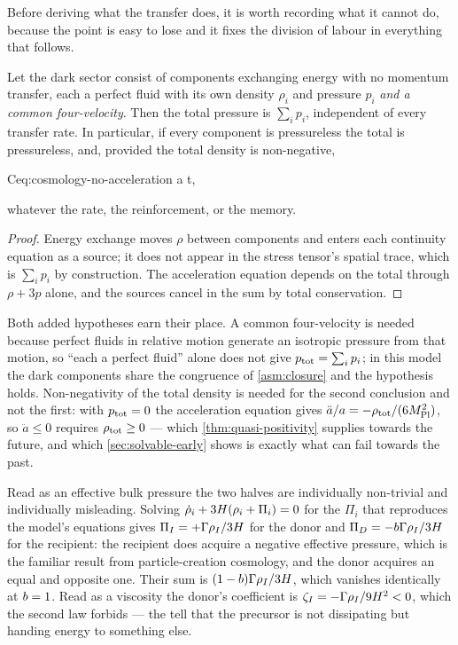 Before deriving what the transfer does, it is worth recording what it cannot
do, because the point is easy to lose and it fixes the division of labour in
everything that follows.

\begin{proposition}
  \label{prop:no-pressure-from-kinetics}
  Let the dark sector consist of components exchanging energy with no momentum
  transfer, each a perfect fluid with its own density $\rho_i$ and pressure
  $p_i$ \emph{and a common four-velocity}. Then the total pressure is
  $\sum_i p_i$, independent of every transfer rate. In particular, if every
  component is pressureless the total is pressureless, and, provided the total
  density is non-negative,
  \begin{keyresult}{C}{eq:cosmology-no-acceleration}
    \ddot a \quad{}t,
  \end{keyresult}
  whatever the rate, the reinforcement, or the memory.
\end{proposition}

\begin{proof}
  Energy exchange moves $\rho$ between components and enters each continuity
  equation as a source; it does not appear in the stress tensor's spatial
  trace, which is $\sum_ip_i$ by construction. The acceleration equation
  depends on the total through $\rho+3p$ alone, and the sources cancel in the
  sum by total conservation.
\end{proof}

Both added hypotheses earn their place. A common four-velocity is needed
because perfect fluids in relative motion generate an isotropic pressure from
that motion, so ``each a perfect fluid'' alone does not give
$p_{\rm tot}=\sum_ip_i$; in this model the dark components share the congruence
of \cref{asm:closure} and the hypothesis holds. Non-negativity of the total
density is needed for the second conclusion and not the first: with
$p_{\rm tot}=0$ the acceleration equation gives
$\ddot a/a=-\rho_{\rm tot}/(6M_{\mathrm{Pl}}^2)$, so $\ddot a\le0$ requires
$\rho_{\rm tot}\ge0$ --- which \cref{thm:quasi-positivity} supplies towards the
future, and which \cref{sec:solvable-early} shows is exactly what can fail
towards the past.

Read as an effective bulk pressure the two halves are individually non-trivial
and individually misleading. Solving $\dot\rho_i+3H(\rho_i+\Pi_i)=0$ for the
$\Pi_i$ that reproduces the model's equations gives
$\Pi_I=+\Gamma\rho_{I}/3H$ for the donor and $\Pi_D=-b\Gamma\rho_{I}/3H$ for
the recipient: the recipient does acquire a negative effective pressure, which
is the familiar result from particle-creation cosmology, and the donor acquires
an equal and opposite one. Their sum is $(1-b)\Gamma\rho_{I}/3H$, which
vanishes identically at $b=1$. Read as a viscosity the donor's coefficient
is $\zeta_I=-\Gamma\rho_{I}/9H^2<0$, which the second law forbids --- the tell
that the precursor is not dissipating but handing energy to something else.

